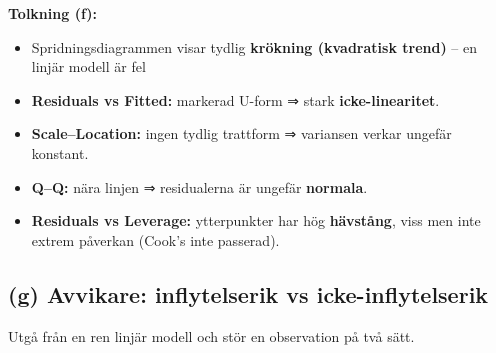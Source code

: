 \documentclass[
  11pt,
]{article}
\providecommand{\tightlist}{%
  \setlength{\itemsep}{0pt}\setlength{\parskip}{0pt}}
\begin{document}
\textbf{Tolkning (f):}

\begin{itemize}
\tightlist
\item
  Spridningsdiagrammen visar tydlig \textbf{krökning (kvadratisk trend)}
  -- en linjär modell är fel
\item
  \textbf{Residuals vs Fitted:} markerad U-form ⇒ stark
  \textbf{icke-linearitet}.
\item
  \textbf{Scale--Location:} ingen tydlig trattform ⇒ variansen verkar
  ungefär konstant.
\item
  \textbf{Q--Q:} nära linjen ⇒ residualerna är ungefär \textbf{normala}.
\item
  \textbf{Residuals vs Leverage:} ytterpunkter har hög
  \textbf{hävstång}, viss men inte extrem påverkan (Cook's inte
  passerad).
\end{itemize}

\subsection{(g) Avvikare: inflytelserik vs
icke-inflytelserik}\label{g-avvikare-inflytelserik-vs-icke-inflytelserik}

Utgå från en ren linjär modell och stör en observation på två sätt.
\end{document}
